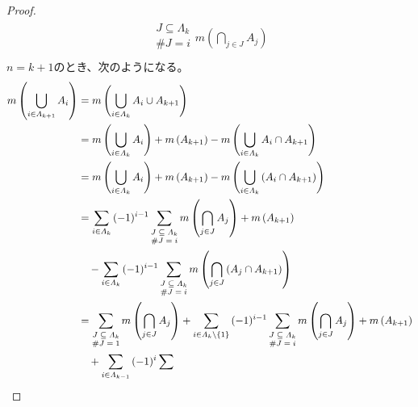 \documentclass[dvipdfmx]{jsarticle}
\begin{document}
\begin{proof}
\begin{align*}
{{\begin{matrix}
J \subseteq \varLambda_{k} \\
\#J = i \\
\end{matrix}} {m\left( \bigcap_{j \in J} A_{j} \right)}}
\end{align*}
$n = k + 1$のとき、次のようになる。
\begin{align*}
m\left( \bigcup_{i \in \varLambda_{k + 1}} A_{i} \right) &= m\left( \bigcup_{i \in \varLambda_{k}} A_{i} \cup A_{k + 1} \right)\\
&= m\left( \bigcup_{i \in \varLambda_{k}} A_{i} \right) + m\left( A_{k + 1} \right) - m\left( \bigcup_{i \in \varLambda_{k}} A_{i} \cap A_{k + 1} \right)\\
&= m\left( \bigcup_{i \in \varLambda_{k}} A_{i} \right) + m\left( A_{k + 1} \right) - m\left( \bigcup_{i \in \varLambda_{k}} \left( A_{i} \cap A_{k + 1} \right) \right)\\
&= \sum_{i \in \varLambda_{k} } {( - 1)^{i - 1}\sum_{\scriptsize \begin{matrix}
J \subseteq \varLambda_{k} \\
\#J = i \\
\end{matrix}} {m\left( \bigcap_{j \in J} A_{j} \right)}} + m\left( A_{k + 1} \right) \\
&\quad - \sum_{i \in \varLambda_{k} } {( - 1)^{i - 1}\sum_{\scriptsize \begin{matrix}
J \subseteq \varLambda_{k} \\
\#J = i \\
\end{matrix}} {m\left( \bigcap_{j \in J} \left( A_{j} \cap A_{k + 1} \right) \right)}}\\
&= \sum_{\scriptsize \begin{matrix}
J \subseteq \varLambda_{k} \\
\#J = 1 \\
\end{matrix}} {m\left( \bigcap_{j \in J} A_{j} \right)} + \sum_{i \in \varLambda_{k} \setminus \left\{ 1 \right\}} {( - 1)^{i - 1}\sum_{\scriptsize \begin{matrix}
J \subseteq \varLambda_{k} \\
\#J = i \\
\end{matrix}} {m\left( \bigcap_{j \in J} A_{j} \right)}} + m\left( A_{k + 1} \right) \\
&\quad + \sum_{i \in \varLambda_{k - 1} } {( - 1)^{i}\sum_{\scriptsize \begin{matrix}

\end{matrix}}}
\end{align*}
\end{proof}
\end{document}
